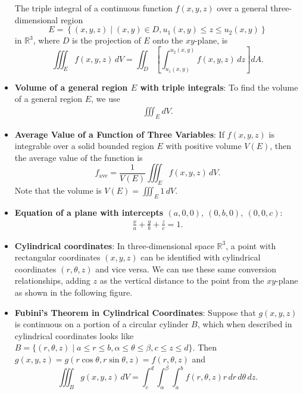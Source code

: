 \documentclass{report}
\begin{document}
\begin{itemize}
            The triple integral of a continuous function $f(x,y,z)$ over a general three-dimensional region
            \[
                E = \left\{ (x,y,z) \mid (x,y) \in D, u_1(x,y) \leq z \leq u_2(x,y) \right\}
            \]
            in $\mathbb{R}^3$, where $D$ is the projection of $E$ onto the $xy$-plane, is
            \[
                \iiint_E f(x,y,z) \, dV = \iint_D \left[ \int_{u_1(x,y)}^{u_2(x,y)} f(x,y,z) \, dz \right] dA.
            \]
        \item \textbf{Volume of a general region $E$ with triple integrals}: To find the volume of a general  region $E$, we use
            \begin{align*}
                \iiint_E dV
            .\end{align*}
        \item \textbf{Average Value of a Function of Three Variables}:
            If $f(x,y,z)$ is integrable over a solid bounded region $E$ with positive volume $V(E)$, then the average value of the function is
            \[
                f_{\text{ave}} = \frac{1}{V(E)} \iiint_E f(x,y,z) \, dV.
            \]
            Note that the volume is $V(E) = \iiint_E 1 \, dV$.
        \item \textbf{Equation of a plane with intercepts $(a,0,0),\ (0,b,0),\ (0,0,c) $}:
            \begin{align*}
                \frac{x}{a} + \frac{y}{b} + \frac{z}{c} = 1
            .\end{align*}
        \item \textbf{Cylindrical coordinates}:
            In three-dimensional space \(\mathbb{R}^3\), a point with rectangular coordinates \((x,y,z)\) can be identified with cylindrical coordinates \((r,\theta,z)\) and vice versa. We can use these same conversion relationships, adding \(z\) as the vertical distance to the point from the \(xy\)-plane as shown in the following figure.
            \bigbreak \noindent 
        \item \textbf{Fubini’s Theorem in Cylindrical Coordinates}:
            Suppose that \(g(x,y,z)\) is continuous on a portion of a circular cylinder \(B\), which when described in cylindrical coordinates looks like \(B = \{(r,\theta,z) \mid a \leq r \leq b, \alpha \leq \theta \leq \beta, c \leq z \leq d\}\).
            \bigbreak \noindent 
            Then \(g(x,y,z) = g(r \cos \theta, r \sin \theta, z) = f(r, \theta, z)\) and
            \[
                \iiint_B g(x,y,z) \, dV = \int_c^d \int_\alpha^\beta \int_a^b f(r, \theta, z) r \, dr \, d\theta \, dz.
\]
\end{itemize}
\end{document}
